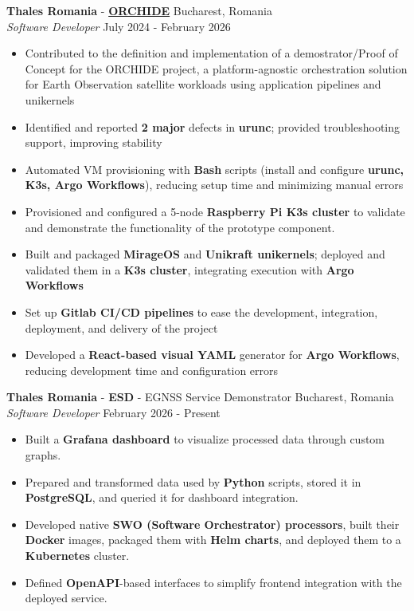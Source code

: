 \documentclass[a4paper,9pt]{extarticle}
\begin{document}
\noindent
\textbf{Thales Romania} - \textbf{\href{https://www.thalesaleniaspace.com/en/news/orchide-enhancing-management-onboard-satellite-applications}{ORCHIDE}} \hfill Bucharest, Romania \\
\textit{Software Developer} \hfill July 2024 - February 2026
\begin{itemize}
    \item  Contributed to the definition and implementation of a demostrator/Proof of Concept for the ORCHIDE project, a platform-agnostic orchestration solution for Earth Observation satellite workloads using application pipelines and unikernels
    \item Identified and reported \textbf{2 major}  defects in \textbf{urunc}; provided troubleshooting support, improving stability
    \item Automated VM provisioning with \textbf{Bash} scripts (install and configure \textbf{urunc, K3s, Argo Workflows}), reducing setup time and minimizing manual errors
    \item Provisioned and configured a 5-node \textbf{Raspberry Pi K3s cluster} to validate and demonstrate the functionality of the prototype component.
    \item Built and packaged \textbf{MirageOS} and \textbf{Unikraft unikernels}; deployed and validated them in a \textbf{K3s cluster}, integrating execution with \textbf{Argo Workflows}
    \item Set up \textbf{Gitlab CI/CD pipelines} to ease the development, integration, deployment, and delivery of the project
    \item Developed a \textbf{React-based visual YAML} generator for \textbf{Argo Workflows}, reducing development time and configuration errors
\end{itemize}

\noindent \textbf{Thales Romania} - \textbf{ESD} - EGNSS Service Demonstrator \hfill Bucharest, Romania \\ \textit{Software Developer} \hfill February 2026 - Present 
\begin{itemize} 
    \item Built a \textbf{Grafana dashboard} to visualize processed data through custom graphs.\item Prepared and transformed data used by \textbf{Python} scripts, stored it in \textbf{PostgreSQL}, and queried it for dashboard integration.
    \item Developed native \textbf{SWO (Software Orchestrator) processors}, built their \textbf{Docker} images, packaged them with \textbf{Helm charts}, and deployed them to a \textbf{Kubernetes} cluster.
    \item Defined \textbf{OpenAPI}-based interfaces to simplify frontend integration with the deployed service.
\end{itemize}
\end{document}
